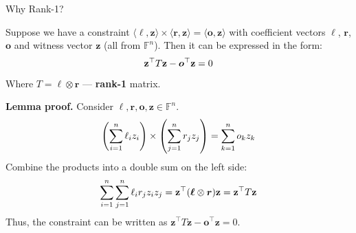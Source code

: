 \documentclass{zkdl-presentation-template}
\begin{document}
    \begin{frame}{Why Rank-1?}
        \begin{lemma}
            Suppose we have a constraint $\langle \boldsymbol{\ell}, \mathbf{z}\rangle \times \langle \boldsymbol{r}, \mathbf{z}\rangle = \langle \boldsymbol{o}, \mathbf{z} \rangle$ 
            with coefficient vectors $\boldsymbol{\ell}$, $\boldsymbol{r}$, $\boldsymbol{o}$ and witness vector 
            $\mathbf{z}$ (all from $\mathbb{F}^n$). Then it can be expressed in the form:
            \vspace{-5pt}
            \begin{equation*}
                 \mathbf{z}^{\top} T \mathbf{z} - \boldsymbol{o}^{\top} \mathbf{z} = 0
                 \vspace{-5pt}
            \end{equation*}
            Where $T = \boldsymbol{\ell} \otimes \boldsymbol{r}$ --- \textbf{rank-1} matrix.
        \end{lemma}
        \vspace{-10pt}
        \pause
        \textbf{Lemma proof.} Consider $\boldsymbol{\ell}, \boldsymbol{r}, \boldsymbol{o}, \mathbf{z} \in \mathbb{F}^n$.
        \vspace{-5pt}
        \begin{equation*}
            \left(\sum_{i=1}^{n} \ell_i z_i\right) \times \left(\sum_{j=1}^{n} r_j z_j\right) = \sum_{k=1}^{n} o_k z_k
            \vspace{-5pt}
        \end{equation*}
        Combine the products into a double sum on the left side:
        \vspace{-5pt}
        \begin{equation*}
            \sum_{i=1}^{n} \sum_{j=1}^{n} \ell_i r_j z_i z_j = \mathbf{z}^{\top} (\boldsymbol{\ell} \otimes \boldsymbol{r}) \mathbf{z} = \mathbf{z}^{\top} T \mathbf{z}
            \vspace{-5pt}
        \end{equation*}
        Thus, the constraint can be written as $\mathbf{z}^{\top} T \mathbf{z} - \boldsymbol{o}^{\top} \mathbf{z} = 0$.
    \end{frame}

    \makeclosingframe
\end{document}
